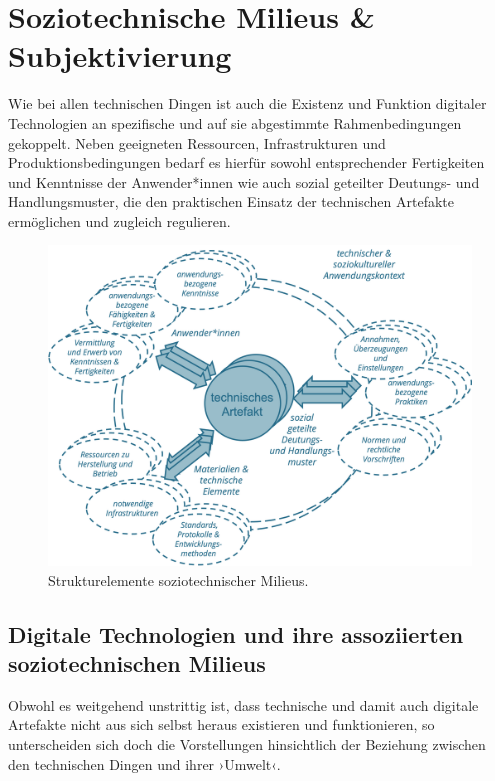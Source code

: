 \documentclass[
  a4paper,
]{book}
\begin{document}
\chapter{Soziotechnische Milieus \& Subjektivierung}\label{soziotechnische-milieus-subjektivierung}

Wie bei allen technischen Dingen ist auch die Existenz und Funktion digitaler Technologien an spezifische und auf sie abgestimmte Rahmenbedingungen gekoppelt. Neben geeigneten Ressourcen, Infrastrukturen und Produktionsbedingungen bedarf es hierfür sowohl entsprechender Fertigkeiten und Kenntnisse der Anwender*innen wie auch sozial geteilter Deutungs- und Handlungsmuster, die den praktischen Einsatz der technischen Artefakte ermöglichen und zugleich regulieren.

\begin{figure}

{\centering \includegraphics{Figures/12-01-SoziotechnischeMilieus} 

}

\caption{Strukturelemente soziotechnischer Milieus.}\label{fig:fig19}
\end{figure}

\section{Digitale Technologien und ihre assoziierten soziotechnischen Milieus}\label{digitale-technologien-und-ihre-assoziierten-soziotechnischen-milieus}

Obwohl es weitgehend unstrittig ist, dass technische und damit auch digitale Artefakte nicht aus sich selbst heraus existieren und funktionieren, so unterscheiden sich doch die Vorstellungen hinsichtlich der Beziehung zwischen den technischen Dingen und ihrer ›Umwelt‹.
\end{document}
